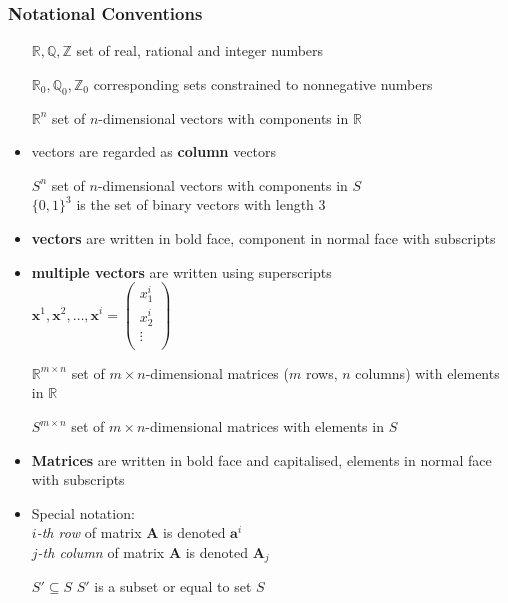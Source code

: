 \documentclass[11pt]{article}
\begin{document}
\subsubsection{Notational Conventions}
\begin{itemize}[label=,leftmargin=*, labelindent=2cm, labelsep=1cm]
	\item[$\mathbb{R}, \mathbb{Q}, \mathbb{Z}$] set of real, rational and integer numbers
	\item[$\mathbb{R}_0, \mathbb{Q}_0, \mathbb{Z}_0$] corresponding sets constrained to nonnegative numbers
	\item[$\mathbb{R}^n$] set of $n$-dimensional vectors with components in $\mathbb{R}$
	\item vectors are regarded as \textbf{column} vectors
	\item[$S^n$] set of $n$-dimensional vectors with components in $S$\\
	$\{0,1\}^3$ is the set of binary vectors with length 3
	\item \textbf{vectors} are written in bold face, component in normal face with subscripts
	\item \textbf{multiple vectors} are written using superscripts\\
	$\textbf{x}^1,\textbf{x}^2,\dots,\textbf{x}^i = \begin{pmatrix}
		x_1^i\\
		x_2^i\\
		\vdots\\
	\end{pmatrix}$
	\item[$\mathbb{R}^{{m\times n}}$] set of $m\times n$-dimensional matrices ($m$ rows, $n$ columns) with elements in $\mathbb{R}$
	\item[$S^{m\times n}$] set of $m\times n$-dimensional matrices with elements in $S$
	\item \textbf{Matrices} are written in bold face and capitalised, elements in normal face with subscripts
	\item Special notation:\\
	\emph{$i$-th row} of matrix $\textbf{A}$ is denoted $\textbf{a}^{i}$\\
	\emph{$j$-th column} of matrix $\textbf{A}$ is denoted $\textbf{A}_j$
	\item[$S' \subseteq S$] $S'$ is a subset or equal to set $S$
\end{itemize}
\end{document}

